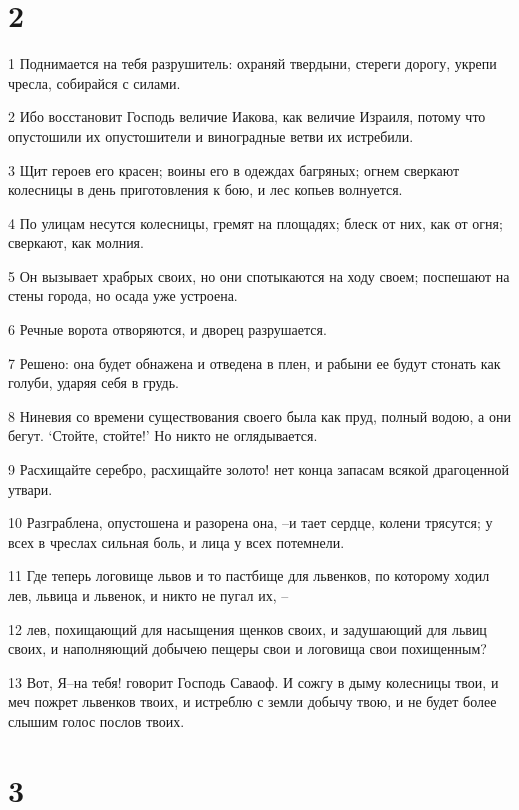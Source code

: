 \chapter{2}

\par 1 Поднимается на тебя разрушитель: охраняй твердыни, стереги дорогу, укрепи чресла, собирайся с силами.
\par 2 Ибо восстановит Господь величие Иакова, как величие Израиля, потому что опустошили их опустошители и виноградные ветви их истребили.
\par 3 Щит героев его красен; воины его в одеждах багряных; огнем сверкают колесницы в день приготовления к бою, и лес копьев волнуется.
\par 4 По улицам несутся колесницы, гремят на площадях; блеск от них, как от огня; сверкают, как молния.
\par 5 Он вызывает храбрых своих, но они спотыкаются на ходу своем; поспешают на стены города, но осада уже устроена.
\par 6 Речные ворота отворяются, и дворец разрушается.
\par 7 Решено: она будет обнажена и отведена в плен, и рабыни ее будут стонать как голуби, ударяя себя в грудь.
\par 8 Ниневия со времени существования своего была как пруд, полный водою, а они бегут. `Стойте, стойте!' Но никто не оглядывается.
\par 9 Расхищайте серебро, расхищайте золото! нет конца запасам всякой драгоценной утвари.
\par 10 Разграблена, опустошена и разорена она, --и тает сердце, колени трясутся; у всех в чреслах сильная боль, и лица у всех потемнели.
\par 11 Где теперь логовище львов и то пастбище для львенков, по которому ходил лев, львица и львенок, и никто не пугал их, --
\par 12 лев, похищающий для насыщения щенков своих, и задушающий для львиц своих, и наполняющий добычею пещеры свои и логовища свои похищенным?
\par 13 Вот, Я--на тебя! говорит Господь Саваоф. И сожгу в дыму колесницы твои, и меч пожрет львенков твоих, и истреблю с земли добычу твою, и не будет более слышим голос послов твоих.

\chapter{3}

